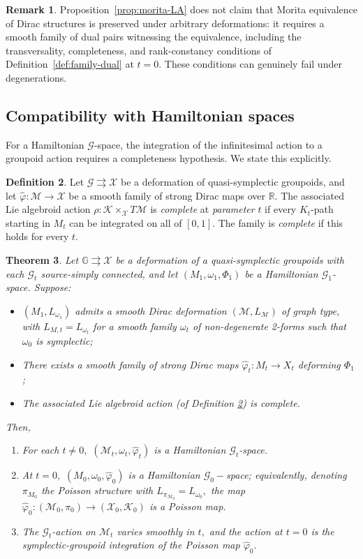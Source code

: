 \documentclass[reqno]{amsart}
\theoremstyle{plain}
\newtheorem{Thm}{Theorem}[section]
\theoremstyle{definition}
\newtheorem{Def}[Thm]{Definition}
\newtheorem{Rem}[Thm]{Remark}
\newcommand{\R}{\mathbb{R}}
\newcommand{\G}{\mathcal{G}}
\newcommand{\too}{\longrightarrow}
\newcommand{\M}{\mathcal{M}}
\newcommand{\X}{\mathcal{X}}
\newcommand{\K}{\mathcal{K}}
\begin{document}
\begin{Rem}
Proposition~\ref{prop:morita-LA} does not claim that Morita equivalence of Dirac structures is preserved under arbitrary deformations: it requires a smooth family of dual pairs witnessing the equivalence, including the transversality, completeness, and rank-constancy conditions of Definition~\ref{def:family-dual} at $t = 0$. These conditions can genuinely fail under degenerations.
\end{Rem}


\subsection{Compatibility with Hamiltonian spaces}
For a Hamiltonian $\G$-space, the integration of the infinitesimal action to a groupoid action requires a completeness hypothesis. We state this explicitly.

\begin{Def} \label{Completeness}
    Let $\G \rightrightarrows \X$ be a deformation of quasi-symplectic groupoids, and let $\widehat{\varphi}: \M \too \X$ be a smooth family of strong Dirac maps over $\R.$ The associated Lie algebroid action $\rho: \K \times_{\X} T\M$ is \textit{complete} at \textit{parameter} $t$ if every $K_t$-path starting in $M_t$ can be integrated on all of $[0,1].$ The family is \textit{complete} if this holds for every $t.$
\end{Def}


\begin{Thm}\label{thm:ham-deform}
Let $\mathbb{G} \rightrightarrows \X$ be a deformation of a quasi-symplectic groupoids with each $\G_t$ source-simply connected, and let $(M_1,\omega_1,\Phi_1)$ be a Hamiltonian $\G_1$-space. Suppose: \begin{itemize}
\item [(i)] $(M_1,L_{\omega_1})$ admits a smooth Dirac deformation $(\M,L_{\M})$ of graph type, with $L_{M,t} = L_{\omega_t}$ for a smooth family $\omega_t$ of non-degenerate 2-forms such that $\omega_0$ is symplectic;
\item [(ii)] There exists a smooth family of strong Dirac maps $\widehat{\varphi}_t: M_t \too X_t$ deforming $\Phi_1$;
\item [(iii)] The associated Lie algebroid action (of Definition \ref{Completeness}) is complete.
\end{itemize}

Then, \begin{enumerate}
    \item For each $t\neq 0,$ $(\M_t,\omega_t,\widehat{\varphi}_t)$ is a Hamiltonian $\G_t$-space.
    \item At $t = 0,$ $(M_0,\omega_0,\widehat{\varphi}_0)$ is a Hamiltonian $\G_0-$space; equivalently, denoting $\pi_{M_0}$ the Poisson structure with $L_{\pi_{\M_0}} = L_{\omega_0},$ the map $\widehat{\varphi}_0: (\M_0, \pi_0) \too (\X_0,\K_0)$ is a Poisson map.
    \item  The $\G_t$-action on $\M_t$ varies smoothly in $t,$ and the action at $t =0$ is the symplectic-groupoid integration of the Poisson map $\widehat{\varphi}_0.$
\end{enumerate}
\end{Thm}
\end{document}
